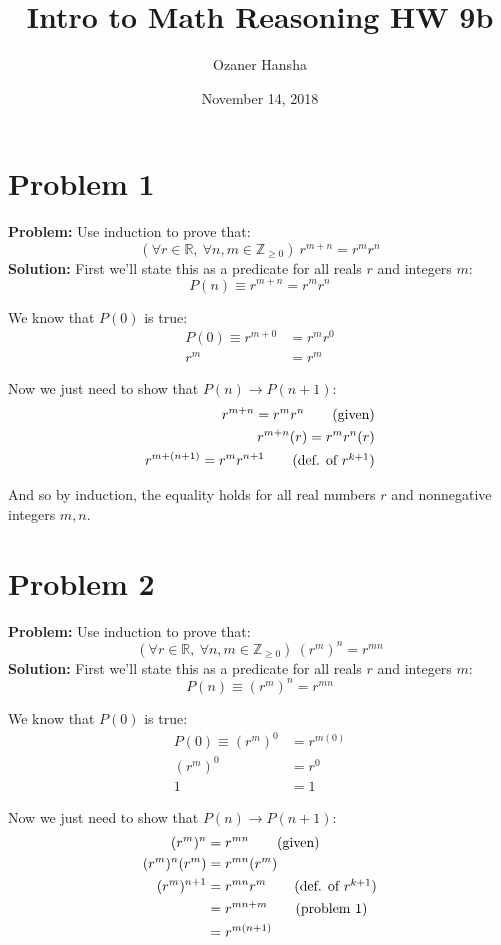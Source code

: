\documentclass{article}
\begin{document}
\title{Intro to Math Reasoning HW 9b}
\author{Ozaner Hansha}
\date{November 14, 2018}
\maketitle

\section*{Problem 1}
\textbf{Problem:} Use induction to prove that:
$$(\forall r\in\mathbb R,\ \forall n,m\in\mathbb Z_{\ge0})\ r^{m+n}=r^mr^n$$
\textbf{Solution:} First we'll state this as a predicate for all reals $r$ and integers $m$:
$$P(n)\equiv r^{m+n}=r^mr^n$$

We know that $P(0)$ is true:
\begin{align*}
  P(0)\equiv r^{m+0}&=r^mr^0\\
  r^{m}&=r^m\tag{def. of $r^0$}
\end{align*}

Now we just need to show that $P(n)\rightarrow P(n+1)$:
\begin{align*}
  r^{m+n}=r^mr^n\tag{given}\\
  r^{m+n}(r)=r^mr^n(r)\\
  r^{m+(n+1)}=r^mr^{n+1}\tag{def. of $r^{k+1}$}
\end{align*}

And so by induction, the equality holds for all real numbers $r$ and nonnegative integers $m,n$.

\section*{Problem 2}
\textbf{Problem:} Use induction to prove that:
$$(\forall r\in\mathbb R,\ \forall n,m\in\mathbb Z_{\ge0})\ (r^m)^n=r^{mn}$$
\textbf{Solution:} First we'll state this as a predicate for all reals $r$ and integers $m$:
$$P(n)\equiv (r^m)^n=r^{mn}$$

We know that $P(0)$ is true:
\begin{align*}
  P(0)\equiv (r^m)^0&=r^{m(0)}\\
  (r^m)^0&=r^0\\
  1&=1\tag{def. of $r^0$}
\end{align*}

Now we just need to show that $P(n)\rightarrow P(n+1)$:
\begin{align*}
  (r^m)^n&=r^{mn}\tag{given}\\
  (r^m)^n(r^m)&=r^{mn}(r^m)\\
  (r^m)^{n+1}&=r^{mn}r^m\tag{def. of $r^{k+1}$}\\
  &=r^{mn+m}\tag{problem 1}\\
  &=r^{m(n+1)}
\end{align*}
\end{document}
